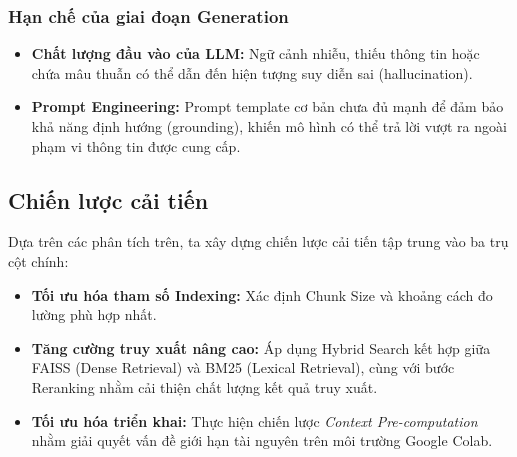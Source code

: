 \subsubsection{Hạn chế của giai đoạn Generation}

\begin{itemize}
  \item \textbf{Chất lượng đầu vào của LLM:} Ngữ cảnh nhiễu, thiếu thông tin hoặc chứa mâu thuẫn có thể dẫn đến hiện tượng suy diễn sai (hallucination).
  \item \textbf{Prompt Engineering:} Prompt template cơ bản chưa đủ mạnh để đảm bảo khả năng định hướng (grounding), khiến mô hình có thể trả lời vượt ra ngoài phạm vi thông tin được cung cấp.
\end{itemize}

\subsection{Chiến lược cải tiến}

Dựa trên các phân tích trên, ta xây dựng chiến lược cải tiến tập trung vào ba trụ cột chính:

\begin{itemize}
  \item \textbf{Tối ưu hóa tham số Indexing:} Xác định Chunk Size và khoảng cách đo lường phù hợp nhất.
  \item \textbf{Tăng cường truy xuất nâng cao:} Áp dụng Hybrid Search kết hợp
    giữa FAISS (Dense Retrieval) và BM25 (Lexical Retrieval), cùng với bước Reranking nhằm
    cải thiện chất lượng kết quả truy xuất.
  \item \textbf{Tối ưu hóa triển khai:} Thực hiện chiến lược \textit{Context Pre-computation} nhằm giải
    quyết vấn đề giới hạn tài nguyên trên môi trường Google Colab.
\end{itemize}

